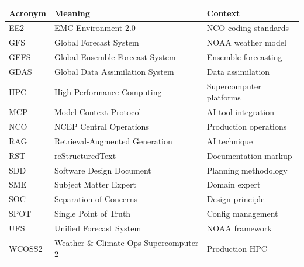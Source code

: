 \documentclass[11pt,letterpaper]{article}
\begin{document}
\begin{longtable}{@{}lll@{}}
\toprule
\textbf{Acronym} & \textbf{Meaning} & \textbf{Context} \\
\midrule
\endhead
EE2 & EMC Environment 2.0 & NCO coding standards \\
GFS & Global Forecast System & NOAA weather model \\
GEFS & Global Ensemble Forecast System & Ensemble forecasting \\
GDAS & Global Data Assimilation System & Data assimilation \\
HPC & High-Performance Computing & Supercomputer platforms \\
MCP & Model Context Protocol & AI tool integration \\
NCO & NCEP Central Operations & Production operations \\
RAG & Retrieval-Augmented Generation & AI technique \\
RST & reStructuredText & Documentation markup \\
SDD & Software Design Document & Planning methodology \\
SME & Subject Matter Expert & Domain expert \\
SOC & Separation of Concerns & Design principle \\
SPOT & Single Point of Truth & Config management \\
UFS & Unified Forecast System & NOAA framework \\
WCOSS2 & Weather \& Climate Ops Supercomputer 2 & Production HPC \\
\bottomrule
\end{longtable}
\end{document}
